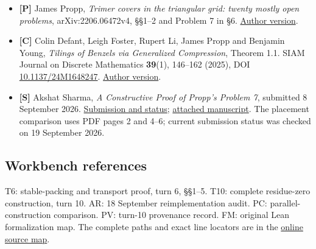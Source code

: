 \documentclass[
  11pt,
]{article}
\providecommand{\tightlist}{%
  \setlength{\itemsep}{0pt}\setlength{\parskip}{0pt}}
\begin{document}
\begin{itemize}
\tightlist
\item
  \textbf{{[}P{]}} James Propp, \emph{Trimer covers in the triangular
  grid: twenty mostly open problems}, arXiv:2206.06472v4, §§1--2 and
  Problem 7 in §6. \href{https://arxiv.org/html/2206.06472v4}{Author
  version}.
\item
  \textbf{{[}C{]}} Colin Defant, Leigh Foster, Rupert Li, James Propp
  and Benjamin Young, \emph{Tilings of Benzels via Generalized
  Compression}, Theorem 1.1. SIAM Journal on Discrete Mathematics
  \textbf{39}(1), 146--162 (2025), DOI
  \href{https://doi.org/10.1137/24M1648247}{10.1137/24M1648247}.
  \href{https://arxiv.org/html/2403.07663v1}{Author version}.
\item
  \textbf{{[}S{]}} Akshat Sharma, \emph{A Constructive Proof of Propp's
  Problem 7}, submitted 8 September 2026.
  \href{https://mathdb.com/p/405267/existence-of-benzel-tilings-with-nonnegative-conway-lagarias}{Submission
  and status};
  \href{https://mathdb.com/api/solution-artifacts/35a67ccb-6716-4906-99fe-54ea1784365b/media}{attached
  manuscript}. The placement comparison uses PDF pages 2 and 4--6;
  current submission status was checked on 19 September 2026.
\end{itemize}

\subsection{Workbench references}\label{workbench-references}

T6: stable-packing and transport proof, turn 6, §§1--5. T10: complete
residue-zero construction, turn 10. AR: 18 September reimplementation
audit. PC: parallel-construction comparison. PV: turn-10 provenance
record. FM: original Lean formalization map. The complete paths and
exact line locators are in the
\href{https://github.com/KokunoYumeto/benzel-workbench/blob/main/validation/20260919/CENTERED_ONE_STONE.md\#workbench-source-map}{online
source map}.
\end{document}
